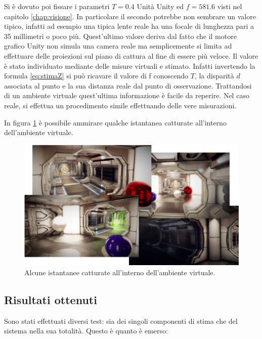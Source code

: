 Si è dovuto poi fissare i parametri $T = 0.4$ Unità Unity ed $f = 581.6$ visti nel capitolo \ref{chap:visione}. In particolare il secondo potrebbe non sembrare un valore tipico, infatti ad esempio una tipica lente reale ha una focale di lunghezza pari a 35 millimetri o poco più. Quest'ultimo valore deriva dal fatto che il motore grafico Unity non simula una camera reale ma semplicemente si limita ad effettuare delle proiezioni sul piano di cattura al fine di essere più veloce. Il valore è stato individuato mediante delle misure virtuali e stimato. Infatti invertendo la formula \ref{eq:stimaZ} si può ricavare il valore di f conoscendo $T$, la disparità $d$ associata al punto e la sua distanza reale dal punto di osservazione. Trattandosi di un ambiente virtuale quest'ultima informazione è facile da reperire. Nel caso reale, si effettua un procedimento simile effettuando delle vere misurazioni.  


In figura \ref{vis:test:scena} è possibile ammirare qualche istantanea catturate all'interno dell'ambiente virtuale.
\begin{figure}[h!]
	\centering
	\includegraphics[width=440pt]{imgs/scene.png}
	\caption{Alcune istantanee catturate all'interno dell'ambiente virtuale.}
	\label{vis:test:scena}
\end{figure} 

\subsection{Risultati ottenuti}
\label{sec:perf}
Sono stati effettuati diversi test: sia dei singoli componenti di stima che del sistema nella sua totalità. Questo è quanto è emerso:

